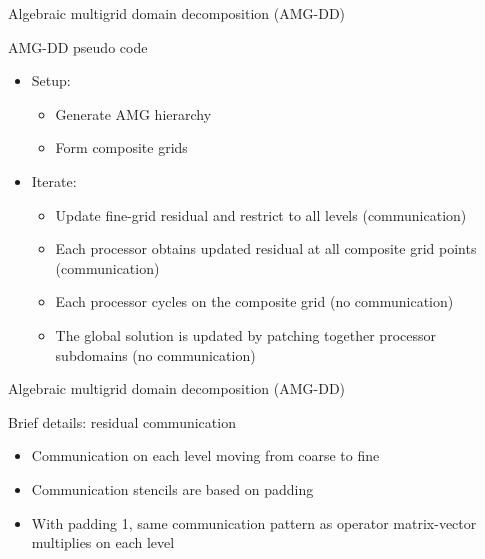 \documentclass[18pt,xcolor=table]{beamer}
\begin{document}
\begin{frame}{Algebraic multigrid domain decomposition (AMG-DD)}
\begin{block}{AMG-DD pseudo code}
\begin{itemize}
\item Setup:
\begin{itemize}
\item Generate AMG hierarchy
\item Form composite grids
\end{itemize}
\item Iterate:
\begin{itemize}
\item Update fine-grid residual and restrict to all levels (communication)
\item Each processor obtains updated residual at all composite grid points (communication)
\item Each processor cycles on the composite grid (no communication)
\item The global solution is updated by patching together processor subdomains (no communication)
\end{itemize}
\end{itemize}
\end{block}

\end{frame}

%
%
%
%

\begin{frame}{Algebraic multigrid domain decomposition (AMG-DD)}
\begin{block}{Brief details: residual communication}
\begin{itemize}
\item Communication on each level moving from coarse to fine
\item Communication stencils are based on padding
\item With padding 1, same communication pattern as operator matrix-vector multiplies on each level 
\end{itemize}
\end{block}

\end{frame}
\end{document}
